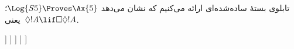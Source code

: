 \documentclass[../../../include/open-logic-section]{subfiles}
\begin{document}
\begin{ex}
  تابلوی بستهٔ ساده‌شده‌ای ارائه می‌کنیم که نشان می‌دهد
  $\Log{S5} \Proves \Ax{5}$؛ یعنی~$\Diamond!A \lif \Box\Diamond!A$.
  \begin{oltableau}
    [\pFmla{\False}{\Diamond\formula{A} \lif \Box\Diamond \formula{A}}{1},
      just = \TAss
      [\pFmla{\True}{\Diamond \formula{A}}{1}, just = {\TRule{\False}{\lif}[1]}
        [\pFmla{\False}{\Box\Diamond \formula{A}}{1},
          just = {\TRule{\False}{\lif}[1]}
          [\pFmla{\False}{\Diamond \formula{A}}{2},
            just = {\TRule{\False}{\Box}[3]}
            [\pFmla{\True}{\formula{A}}{3},
              just = {\TRule{\True}{\Diamond}[2]}
                [\pFmla{\False}{\formula{A}}{3},
                  just = {\TRule{\False}{\Diamond}[4]}, close]
            ]
          ]
        ]
      ]
    ]
  \end{oltableau}
\end{ex}
\end{document}

